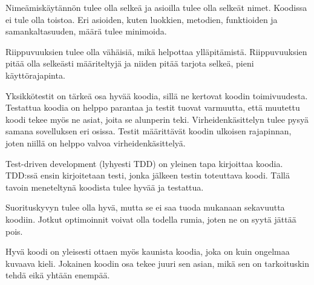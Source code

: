 Nimeämiskäytännön tulee olla selkeä ja asioilla tulee olla selkeät nimet.
Koodissa ei tule olla toistoa. Eri asioiden, kuten luokkien, metodien,
funktioiden ja samankaltasuuden, määrä tulee minimoida.

Riippuvuuksien tulee olla vähäisiä, mikä helpottaa ylläpitämistä. Riippuvuuksien
pitää olla selkeästi määriteltyjä ja niiden pitää tarjota selkeä, pieni
käyttörajapinta.

Yksikkötestit on tärkeä osa hyvää koodia, sillä ne kertovat koodin
toimivuudesta. Testattua koodia on helppo parantaa ja testit tuovat varmuutta,
että muutettu koodi tekee myös ne asiat, joita se alunperin teki.
Virheidenkäsittelyn tulee pysyä samana sovelluksen eri osissa. Testit
määrittävät koodin ulkoisen rajapinnan, joten niillä on helppo valvoa
virheidenkäsittelyä.

Test-driven development (lyhyesti TDD) on yleinen tapa kirjoittaa koodia.
TDD:ssä ensin kirjoitetaan testi, jonka jälkeen testin toteuttava koodi. Tällä
tavoin meneteltynä koodista tulee hyvää ja testattua.

Suorituskyvyn tulee olla hyvä, mutta se ei saa tuoda mukanaan sekavuutta
koodiin. Jotkut optimoinnit voivat olla todella rumia, joten ne on syytä jättää
pois.

Hyvä koodi on yleisesti ottaen myös kaunista koodia, joka on kuin ongelmaa
kuvaava kieli. Jokainen koodin osa tekee juuri sen asian, mikä sen on
tarkoituskin tehdä eikä yhtään enempää.
